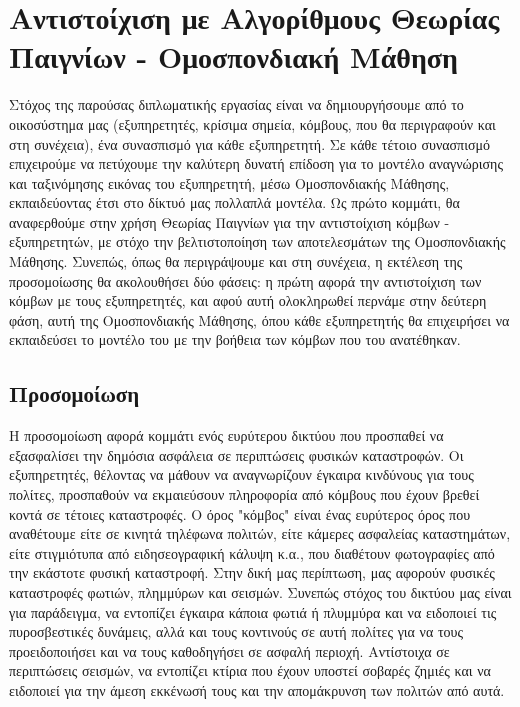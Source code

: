 \chapter{Αντιστοίχιση με Αλγορίθμους Θεωρίας Παιγνίων - Ομοσπονδιακή Μάθηση}

Στόχος της παρούσας διπλωματικής εργασίας είναι να δημιουργήσουμε από το οικοσύστημα μας (εξυπηρετητές, κρίσιμα σημεία, κόμβους, που θα περιγραφούν και στη συνέχεια), ένα συνασπισμό για κάθε εξυπηρετητή. Σε κάθε τέτοιο συνασπισμό επιχειρούμε να πετύχουμε την καλύτερη δυνατή επίδοση για το μοντέλο αναγνώρισης και ταξινόμησης εικόνας του εξυπηρετητή, μέσω Ομοσπονδιακής Μάθησης, εκπαιδεύοντας έτσι στο δίκτυό μας πολλαπλά μοντέλα. Ως πρώτο κομμάτι, θα αναφερθούμε στην χρήση Θεωρίας Παιγνίων για την αντιστοίχιση κόμβων - εξυπηρετητών, με στόχο την βελτιστοποίηση των αποτελεσμάτων της Ομοσπονδιακής Μάθησης. Συνεπώς, όπως θα περιγράψουμε και στη συνέχεια, η εκτέλεση της προσομοίωσης θα ακολουθήσει δύο φάσεις: η πρώτη αφορά την αντιστοίχιση των κόμβων με τους εξυπηρετητές, και αφού αυτή ολοκληρωθεί περνάμε στην δεύτερη φάση, αυτή της Ομοσπονδιακής Μάθησης, όπου κάθε εξυπηρετητής θα επιχειρήσει να εκπαιδεύσει το μοντέλο του με την βοήθεια των κόμβων που του ανατέθηκαν.

\section{Προσομοίωση}

Η προσομοίωση αφορά κομμάτι ενός ευρύτερου δικτύου που προσπαθεί να εξασφαλίσει την δημόσια ασφάλεια σε περιπτώσεις φυσικών καταστροφών. Οι εξυπηρετητές, θέλοντας να μάθουν να αναγνωρίζουν έγκαιρα κινδύνους για τους πολίτες, προσπαθούν να εκμαιεύσουν πληροφορία από κόμβους που έχουν βρεθεί κοντά σε τέτοιες καταστροφές. Ο όρος "κόμβος" είναι ένας ευρύτερος όρος που αναθέτουμε είτε σε κινητά τηλέφωνα πολιτών, είτε κάμερες ασφαλείας καταστημάτων, είτε στιγμιότυπα από ειδησεογραφική κάλυψη κ.α., που διαθέτουν φωτογραφίες από την εκάστοτε φυσική καταστροφή. Στην δική μας περίπτωση, μας αφορούν φυσικές καταστροφές φωτιών, πλημμύρων και σεισμών. Συνεπώς στόχος του δικτύου μας είναι για παράδειγμα, να εντοπίζει έγκαιρα κάποια φωτιά ή πλυμμύρα και να ειδοποιεί τις πυροσβεστικές δυνάμεις, αλλά και τους κοντινούς σε αυτή πολίτες για να τους προειδοποιήσει και να τους καθοδηγήσει σε ασφαλή περιοχή. Αντίστοιχα σε περιπτώσεις σεισμών, να εντοπίζει κτίρια που έχουν υποστεί σοβαρές ζημιές και να ειδοποιεί για την άμεση εκκένωσή τους και την απομάκρυνση των πολιτών από αυτά. 

